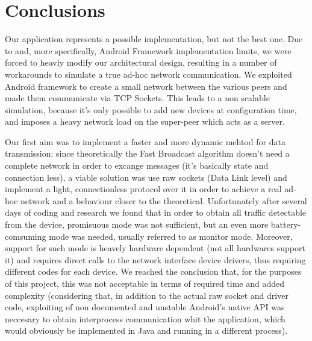 \section{Conclusions}
	Our application represents a possible implementation, but not the best one. Due to \direct and, more specifically, Android \direct Framework implementation limits, we were forced to heavly modify our architectural design, resulting in a number of workarounds to simulate a true ad-hoc network communication. We exploited Android \direct framework to create a small network between the various peers and made them communicate via TCP Sockets. This leads to a non scalable simulation, because it's only possible to add new devices at configuration time, and imposes a heavy network load on the super-peer which acts as a server.
	
	Our first aim was to implement a faster and more dynamic mehtod for data transmission: since theoretically the Fast Broadcast algorithm doesn't need a complete network in order to excange messages (it's basically state and connection less), a viable solution was use raw sockets (Data Link level) and implement a light, connectionless protocol over it in order to achieve a real ad-hoc network and a behaviour closer to the theoretical. Unfortunately after several days of coding and research we found that in order to obtain all traffic detectable from the device, promisuous mode was not sufficient, but an even more battery-comsuming mode was needed, usually referred to as monitor mode. Moreover, support for such mode is heavely hardware dependent (not all hardwares support it) and requires direct calls to the network interface device drivers, thus requiring different codes for each device. We reached the conclusion that, for the purposes of this project, this was not acceptable in terms of required time and added complexity (considering that, in addition to the actual raw socket and driver code, exploiting of non documented and unstable Android's native API was neccesary to obtain interprocess communication whit the application, which would obviously be implemented in Java and running in a different process).
